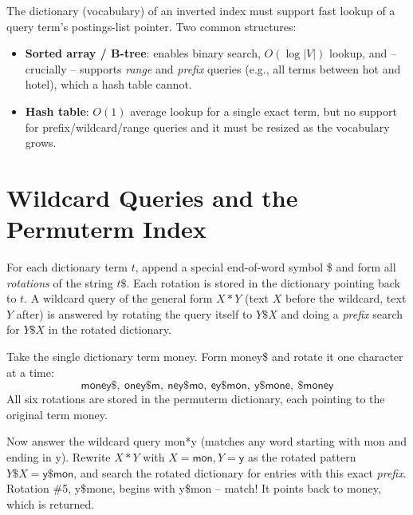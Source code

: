 \documentclass[11pt, a4paper]{article}
\begin{document}
The dictionary (vocabulary) of an inverted index must support fast lookup of a query term's postings-list pointer. Two common structures:
\begin{itemize}
  \item \textbf{Sorted array / B-tree}: enables binary search, $O(\log|V|)$ lookup, and -- crucially -- supports \emph{range} and \emph{prefix} queries (e.g., all terms between \textsf{hot} and \textsf{hotel}), which a hash table cannot.
  \item \textbf{Hash table}: $O(1)$ average lookup for a single exact term, but no support for prefix/wildcard/range queries and it must be resized as the vocabulary grows.
\end{itemize}

\section{Wildcard Queries and the Permuterm Index}

\begin{defbox}
For each dictionary term $t$, append a special end-of-word symbol \$ and form all \emph{rotations} of the string $t\$$. Each rotation is stored in the dictionary pointing back to $t$. A wildcard query of the general form $X\!*\!Y$ (text $X$ before the wildcard, text $Y$ after) is answered by rotating the query itself to $Y\$X$ and doing a \emph{prefix} search for $Y\$X$ in the rotated dictionary.
\end{defbox}

\begin{examplebox}
Take the single dictionary term \textsf{money}. Form \textsf{money\$} and rotate it one character at a time:
\[
\textsf{money\$},\ \textsf{oney\$m},\ \textsf{ney\$mo},\ \textsf{ey\$mon},\ \textsf{y\$mone},\ \textsf{\$money}
\]
All six rotations are stored in the permuterm dictionary, each pointing to the original term \textsf{money}.

Now answer the wildcard query \textsf{mon*y} (matches any word starting with \textsf{mon} and ending in \textsf{y}). Rewrite $X\!*\!Y$ with $X=\textsf{mon}, Y=\textsf{y}$ as the rotated pattern $Y\$X = \textsf{y\$mon}$, and search the rotated dictionary for entries with this exact \emph{prefix}. Rotation \#5, \textsf{y\$mone}, begins with \textsf{y\$mon} -- match! It points back to \textsf{money}, which is returned.
\end{examplebox}
\end{document}
